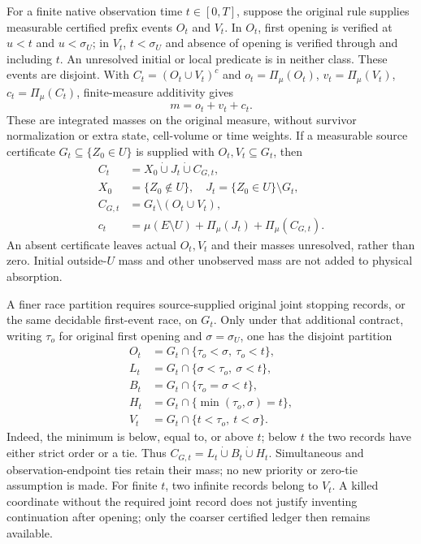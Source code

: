 \documentclass[11pt]{article}
\begin{document}
For a finite native observation time $t\in[0,T]$, suppose the original
rule supplies measurable certified prefix events $O_t$ and $V_t$.
In $O_t$, first opening is verified at $u<t$ and $u<\sigma_U$;
in $V_t$, $t<\sigma_U$ and absence of opening is verified through and
including $t$. An unresolved initial or local predicate is in neither
class. These events are disjoint. With $C_t=(O_t\cup V_t)^c$ and
$o_t=\Pi_\mu(O_t)$, $v_t=\Pi_\mu(V_t)$, $c_t=\Pi_\mu(C_t)$,
finite-measure additivity gives
\begin{equation}
 m=o_t+v_t+c_t.\label{eq:localization-mass-ledger}
\end{equation}
These are integrated masses on the original measure, without survivor
normalization or extra state, cell-volume or time weights.
If a measurable source certificate $G_t\subseteq\{Z_0\in U\}$ is
supplied with $O_t,V_t\subseteq G_t$, then
\begin{equation}
\begin{aligned}
 C_t&=X_0\mathbin{\dot\cup}J_t\mathbin{\dot\cup}C_{G,t},\\
 X_0&=\{Z_0\notin U\},\quad J_t=\{Z_0\in U\}\setminus G_t,\\
 C_{G,t}&=G_t\setminus(O_t\cup V_t),\\
 c_t&=\mu(E\setminus U)+\Pi_\mu(J_t)+\Pi_\mu(C_{G,t}).
\end{aligned}
\end{equation}
An absent certificate leaves actual $O_t,V_t$ and their masses
unresolved, rather than zero. Initial outside-$U$ mass and other
unobserved mass are not added to physical absorption.

A finer race partition requires source-supplied original joint stopping
records, or the same decidable first-event race, on $G_t$. Only under
that additional contract, writing $\tau_o$ for original first opening
and $\sigma=\sigma_U$, one has the disjoint partition
\begin{equation}
\begin{aligned}
 O_t&=G_t\cap\{\tau_o<\sigma,\ \tau_o<t\},\\
 L_t&=G_t\cap\{\sigma<\tau_o,\ \sigma<t\},\\
 B_t&=G_t\cap\{\tau_o=\sigma<t\},\\
 H_t&=G_t\cap\{\min(\tau_o,\sigma)=t\},\\
 V_t&=G_t\cap\{t<\tau_o,\ t<\sigma\}.
\end{aligned}
\end{equation}
Indeed, the minimum is below, equal to, or above $t$; below $t$ the
two records have either strict order or a tie. Thus
$C_{G,t}=L_t\mathbin{\dot\cup}B_t\mathbin{\dot\cup}H_t$.
Simultaneous and observation-endpoint ties retain their mass; no new
priority or zero-tie assumption is made. For finite $t$, two infinite
records belong to $V_t$. A killed coordinate without the required joint
record does not justify inventing continuation after opening; only the
coarser certified ledger then remains available.
\end{document}
